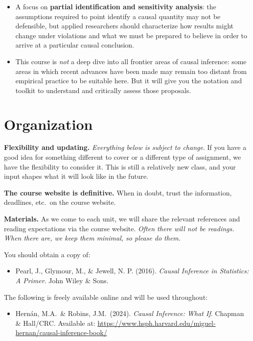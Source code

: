 \documentclass[PS]{syllabus}
\begin{document}
\begin{syllabus}
\begin{itemize}
\item A focus on \textbf{partial identification and sensitivity analysis}: the assumptions required to point identify a causal quantity may not be defensible, but applied researchers should characterize how results might change under violations and what we must be prepared to believe in order to arrive at a particular causal conclusion.

\item  This course is \textit{not} a deep dive into all frontier areas of causal inference: some areas in which recent advances have been made may remain too distant from empirical practice to be suitable here. But it will give you the notation and toolkit to understand and critically assess those proposals.
\end{itemize}


\section{Organization}

\textbf{Flexibility and updating.}  \textit{Everything below is subject to change}. If you have a good idea for something different to cover or a different type of assignment, we have the flexibility to consider it. This is still a relatively new class, and your input shapes what it will look like in the future.

\textbf{The course website is definitive.} When in doubt, trust the information, deadlines, etc.\ on the course website.

\textbf{Materials.} As we come to each unit, we will share the relevant references and reading expectations via the course website.  \textit{Often there will not be readings. When there are, we keep them minimal, so please do them.}

You should obtain a copy of:
\begin{itemize}
\item Pearl, J., Glymour, M., \& Jewell, N. P. (2016). \textit{Causal Inference in Statistics: A Primer}. John Wiley \& Sons.
\end{itemize}

The following is freely available online and will be used throughout:
\begin{itemize}
\item Hern\'an, M.A.\ \& Robins, J.M.\ (2024). \textit{Causal Inference: What If}. Chapman \& Hall/CRC. Available at: \url{https://www.hsph.harvard.edu/miguel-hernan/causal-inference-book/}
\end{itemize}


\end{syllabus}
\end{document}

